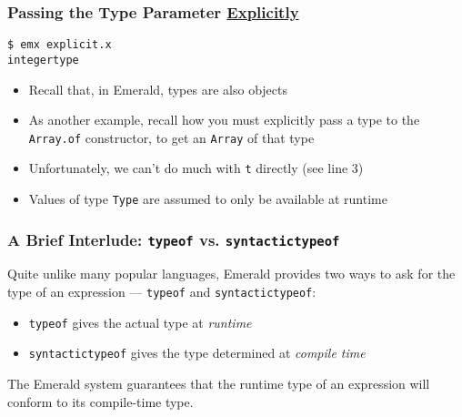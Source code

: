 \begin{frame}[fragile]

\frametitle{Passing the Type Parameter \underline{Explicitly}}


\begin{lstlisting}
$ emx explicit.x
integertype
\end{lstlisting}

\begin{itemize}

\item Recall that, in Emerald, types are also objects

\item As another example, recall how you must explicitly pass a type
to the \lstinline{Array.of} constructor, to get an \lstinline{Array}
of that type

\item Unfortunately, we can't do much with \lstinline{t} directly (see
line 3)

\item Values of type \lstinline{Type} are assumed to only be available
at runtime

\end{itemize}

\end{frame}

\begin{frame}[fragile]

\frametitle{A Brief Interlude: \lstinline{typeof} vs. \lstinline{syntactictypeof}}

Quite unlike many popular languages, Emerald provides two ways to ask
for the type of an expression --- \lstinline{typeof} and
\lstinline{syntactictypeof}:

\begin{itemize}

\item \lstinline{typeof} gives the actual type at \emph{runtime}

\item \lstinline{syntactictypeof} gives the type determined at \emph{compile time}

\end{itemize}

\begin{center}

The Emerald system guarantees that the runtime type of an expression
will conform to its compile-time type.

\end{center}

\end{frame}

